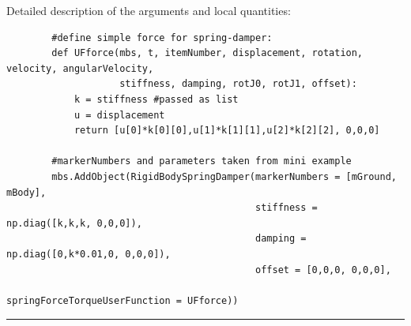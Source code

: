     Detailed description of the arguments and local quantities:
    \finishTable
    \userFunctionExample{}
    \pythonstyle\begin{lstlisting}
        #define simple force for spring-damper:
        def UFforce(mbs, t, itemNumber, displacement, rotation, velocity, angularVelocity, 
                    stiffness, damping, rotJ0, rotJ1, offset): 
            k = stiffness #passed as list
            u = displacement
            return [u[0]*k[0][0],u[1]*k[1][1],u[2]*k[2][2], 0,0,0]
        
        #markerNumbers and parameters taken from mini example
        mbs.AddObject(RigidBodySpringDamper(markerNumbers = [mGround, mBody], 
                                            stiffness = np.diag([k,k,k, 0,0,0]), 
                                            damping = np.diag([0,k*0.01,0, 0,0,0]), 
                                            offset = [0,0,0, 0,0,0],
                                            springForceTorqueUserFunction = UFforce))
    \end{lstlisting}
\vspace{6pt}\par\noindent\rule{\textwidth}{0.4pt}
\label{miniExample_ObjectConnectorRigidBodySpringDamper}
\pythonstyle
